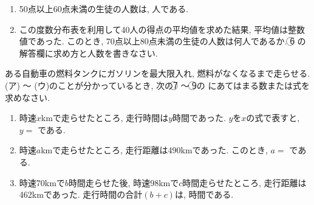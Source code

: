 \documentclass[dvipdfmx, titlepage, 11pt]{jsarticle}
\begin{document}
\begin{enumerate}[(1)]
\item 50点以上60点未満の生徒の人数は,  人である.\\[2cm]
\item この度数分布表を利用して40人の得点の平均値を求めた結果, 平均値は整数値であった. このとき, 70点以上80点未満の生徒の人数は何人であるか. \textcircled{\scriptsize 6} の解答欄に求め方と人数を書きなさい.
\end{enumerate}

\newpage
\noindent {}\hspace{10pt} ある自動車の燃料タンクにガソリンを最大限入れ, 燃料がなくなるまで走らせる. \\
(ア) 〜 (ウ)のことが分かっているとき, 次の\textcircled{\scriptsize 7} 〜 \textcircled{\scriptsize 9}の \fbox{　\hspace{10pt} } にあてはまる数または式を求めなさい.

\begin{center}
\end{center}

\begin{enumerate}[(1)]
\item 時速$x$kmで走らせたところ, 走行時間は$y$時間であった. $y$を$x$の式で表すと, $y=$  である.\\[3cm]
\item 時速$a$kmで走らせたところ, 走行距離は490kmであった. このとき, $a=$  である.\\[3cm]
\item 時速70kmで$b$時間走らせた後, 時速98kmで$c$時間走らせたところ, 走行距離は462kmであった. 走行時間の合計$(b+c)$は,  時間である.
\end{enumerate}
\newpage
\end{document}
